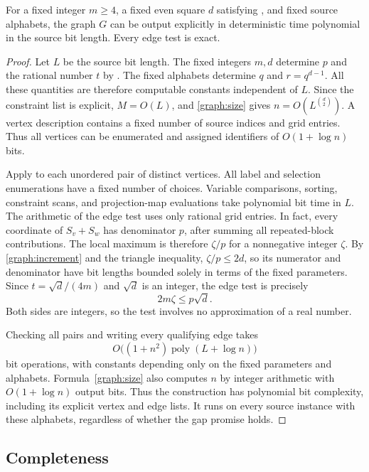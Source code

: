 \begin{proposition}
\label{graph:polynomial}
For a fixed integer $m\geq4$, a fixed even square $d$ satisfying
, and fixed source alphabets,
the graph $G$ can be output explicitly in deterministic time
polynomial in the source bit length.  Every edge test is exact.
\end{proposition}
\begin{proof}
Let $L$ be the source bit length. The fixed integers $m,d$ determine
$p$ and the rational number $t$ by .
The fixed alphabets determine $q$ and $r=q^{d-1}$. All these
quantities are therefore computable constants independent of $L$.
Since the
constraint list is explicit, $M=O(L)$, and
\eqref{graph:size} gives $n=O(L^{\binom d2})$.  A vertex description
contains a fixed number of source indices and grid entries.  Thus all
vertices can be enumerated and assigned identifiers of
$O(1+\log n)$ bits.

Apply  to each unordered pair of distinct
vertices.  All label and selection enumerations have a fixed number
of choices.  Variable comparisons, sorting, constraint scans, and
projection-map evaluations take polynomial bit time in $L$.
The arithmetic of the edge test uses only rational grid entries.
In fact, every coordinate of $S_v+S_w$ has denominator $p$, after
summing all repeated-block contributions.  The local maximum is
therefore $\zeta/p$ for a nonnegative integer $\zeta$.  By
\eqref{graph:increment} and the triangle inequality,
$\zeta/p\leq2d$, so its numerator and denominator have bit lengths
bounded solely in terms of the fixed parameters.  Since
$t=\sqrt d/(4m)$ and $\sqrt d$ is an integer, the edge test is precisely
\[
 2m\zeta\leq p\sqrt d.
\]
Both sides are integers, so the test involves no approximation of a
real number.

Checking all pairs and writing every qualifying edge takes
\[
 O\bigl((1+n^2)\operatorname{poly}(L+\log n)\bigr)
\]
bit operations, with constants depending only on the fixed parameters
and alphabets.  Formula~\eqref{graph:size} also computes $n$ by integer
arithmetic with $O(1+\log n)$ output bits.  Thus the construction has
polynomial bit complexity, including its explicit vertex and edge
lists.  It runs on every source instance with these alphabets,
regardless of whether the gap promise holds.
\end{proof}

\subsection{Completeness}


